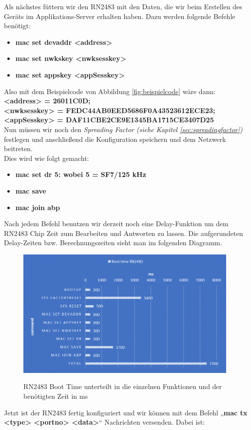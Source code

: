 \noindent
Als nächstes füttern wir den RN2483 mit den Daten, die wir beim Erstellen des Geräts im Applikations-Server erhalten haben. Dazu werden folgende Befehle benötigt:
\begin{itemize}
    \item \textbf{mac set devaddr <address>}
    \item \textbf{mac set nwkskey <nwksesskey>}
    \item \textbf{mac set appskey <appSesskey>}
\end{itemize}
Also mit dem Beispielcode von Abbildung \ref{fig:beispielcode} wäre dann:\\
\textbf{<address> = 26011C0D;}\\
\textbf{<nwksesskey> = FEDC44AB0EED5686F0A43523612ECE23;}\\
\textbf{<appSesskey> = DAF11CBE2CE9E1345BA1715CE3407D25}\\

\noindent
Nun müssen wir noch den \textit{Spreading Factor (siehe Kapitel \ref{sec:spreadingfactor})} festlegen und anschließend die Konfiguration speichern und dem Netzwerk beitreten.\\
Dies wird wie folgt gemacht: 

\begin{itemize}
    \item \textbf{mac set dr 5: wobei 5 = SF7/125 kHz}
    \item \textbf{mac save}
    \item \textbf{mac join abp}
\end{itemize}

\noindent
Nach jedem Befehl benutzen wir derzeit noch eine Delay-Funktion um dem RN2483 Chip Zeit zum Bearbeiten und Antworten zu lassen. Die aufgerundeten Delay-Zeiten bzw. Berechnungszeiten sieht man im folgenden Diagramm.

\begin{figure}[ht]
    \center
    \includegraphics[width=11cm]{Bilder/lora-9.png}\\
    \caption{RN2483 Boot Time unterteilt in die einzelnen Funktionen und der benötigten Zeit in ms}
    \label{fig:boot-time}
\end{figure}
\noindent
Jetzt ist der RN2483 fertig konfiguriert und wir können mit dem Befehl „\textbf{mac tx <type> <portno> <data>}“ Nachrichten versenden. Dabei ist:\\

